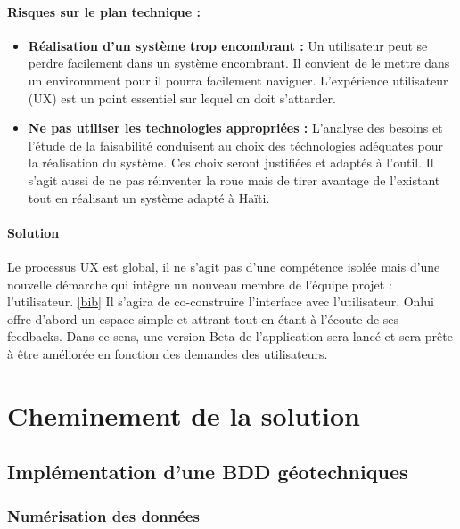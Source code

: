         \paragraph{Risques sur le plan technique :}
        \begin{itemize}
            \item \textbf{Réalisation d'un système trop encombrant :}
            Un utilisateur peut se perdre facilement dans un système encombrant. Il convient de le mettre dans un environnment
            pour il pourra facilement naviguer. L'expérience utilisateur (UX) est un point essentiel sur lequel on doit s'attarder.
            \item \textbf{Ne pas utiliser les technologies appropriées :}
            L'analyse des besoins et l'étude de la faisabilité conduisent au choix des téchnologies adéquates pour la réalisation
            du système. Ces choix seront justifiées et adaptés à l'outil. 
            Il s'agit aussi de ne pas réinventer la roue mais de tirer avantage de l'existant tout en réalisant 
            un système adapté à Haïti.
        \end{itemize}
        \paragraph{Solution}
        Le processus UX est global, il ne s’agit pas d’une compétence isolée mais d’une nouvelle 
        démarche qui intègre un nouveau membre de l’équipe projet : l’utilisateur. \ref{bib}
        Il s'agira de co-construire l'interface avec l'utilisateur. Onlui offre d'abord un espace simple et attrant
        tout en étant à l'écoute de ses feedbacks. Dans ce sens, une version Beta de l'application sera lancé et sera prête
        à être améliorée en fonction des demandes des utilisateurs.


    \section{Cheminement de la solution}
        \subsection{Implémentation d'une BDD géotechniques}
            \subsubsection{Numérisation des données}
                
